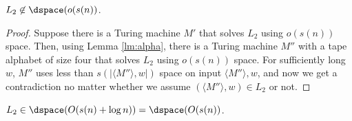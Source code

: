 \documentclass[11pt]{article}
\begin{document}
\begin{lemma}
$L_2 \not\in \dspace(o(s(n))$.
\end{lemma}

\begin{proof}
Suppose there is a Turing machine $M'$ that solves $L_2$
using $o(s(n))$ space. Then, using Lemma \ref{lm:alpha},
there is a Turing machine $M''$ with a tape alphabet of size four
that solves $L_2$ using $o(s(n))$ space. For sufficiently long
$w$,  $M''$ uses less than $s(|\langle M'' \rangle, w|)$ space
on input $\langle M'' \rangle, w$, and now we get a contradiction
no matter whether we assume $(\langle M'' \rangle, w) \in L_2$ or not. 
\end{proof}

\begin{lemma}
$L_2 \in \dspace(O(s(n) + \log n))= \dspace(O(s(n))$.
\end{lemma}
\end{document}
